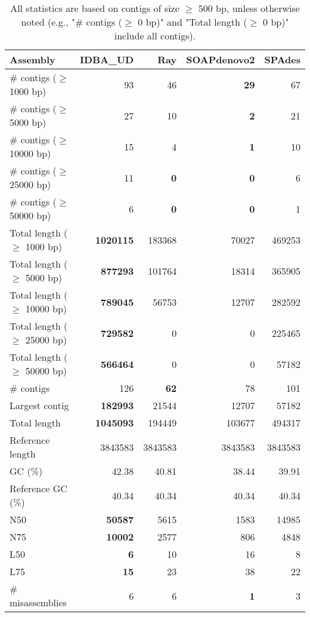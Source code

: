 \documentclass[12pt,a4paper]{article}
\begin{document}
\begin{table}[ht]
\begin{center}
\caption{All statistics are based on contigs of size $\geq$ 500 bp, unless otherwise noted (e.g., "\# contigs ($\geq$ 0 bp)" and "Total length ($\geq$ 0 bp)" include all contigs).}
\begin{tabular}{|l*{4}{|r}|}
\hline
Assembly & IDBA\_UD & Ray & SOAPdenovo2 & SPAdes \\ \hline
\# contigs ($\geq$ 1000 bp) & 93 & 46 & {\bf 29} & 67 \\ \hline
\# contigs ($\geq$ 5000 bp) & 27 & 10 & {\bf 2} & 21 \\ \hline
\# contigs ($\geq$ 10000 bp) & 15 & 4 & {\bf 1} & 10 \\ \hline
\# contigs ($\geq$ 25000 bp) & 11 & {\bf 0} & {\bf 0} & 6 \\ \hline
\# contigs ($\geq$ 50000 bp) & 6 & {\bf 0} & {\bf 0} & 1 \\ \hline
Total length ($\geq$ 1000 bp) & {\bf 1020115} & 183368 & 70027 & 469253 \\ \hline
Total length ($\geq$ 5000 bp) & {\bf 877293} & 101764 & 18314 & 365905 \\ \hline
Total length ($\geq$ 10000 bp) & {\bf 789045} & 56753 & 12707 & 282592 \\ \hline
Total length ($\geq$ 25000 bp) & {\bf 729582} & 0 & 0 & 225465 \\ \hline
Total length ($\geq$ 50000 bp) & {\bf 566464} & 0 & 0 & 57182 \\ \hline
\# contigs & 126 & {\bf 62} & 78 & 101 \\ \hline
Largest contig & {\bf 182993} & 21544 & 12707 & 57182 \\ \hline
Total length & {\bf 1045093} & 194449 & 103677 & 494317 \\ \hline
Reference length & 3843583 & 3843583 & 3843583 & 3843583 \\ \hline
GC (\%) & 42.38 & 40.81 & 38.44 & 39.91 \\ \hline
Reference GC (\%) & 40.34 & 40.34 & 40.34 & 40.34 \\ \hline
N50 & {\bf 50587} & 5615 & 1583 & 14985 \\ \hline
N75 & {\bf 10002} & 2577 & 806 & 4848 \\ \hline
L50 & {\bf 6} & 10 & 16 & 8 \\ \hline
L75 & {\bf 15} & 23 & 38 & 22 \\ \hline
\# misassemblies & 6 & 6 & {\bf 1} & 3 \\ \hline

\end{tabular}
\end{center}
\end{table}
\end{document}
